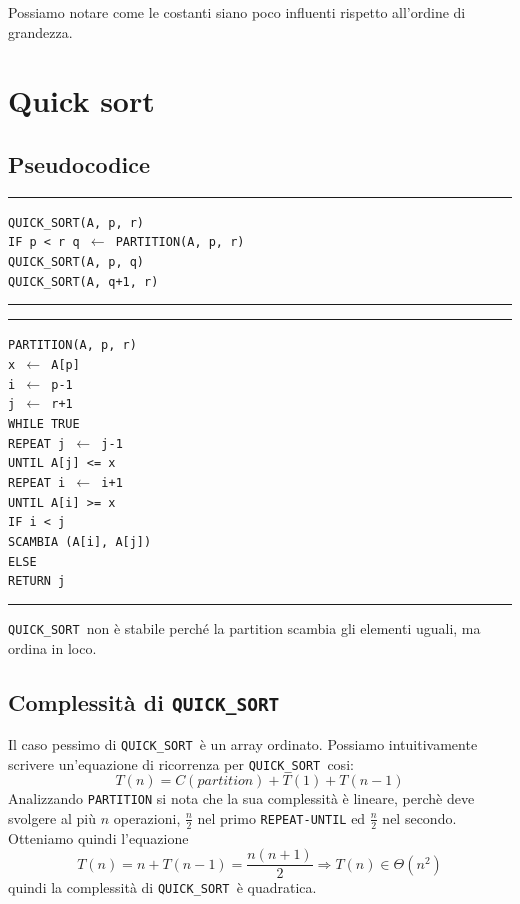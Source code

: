 \documentclass[a4paper,12pt,twoside]{report}
\newcommand\pseudo[1]{\setlength\parindent{0pt}\texttt{#1}\setlength\parindent{24pt} \\}
\newcommand\hlin{\noindent\rule[0.5ex]{\linewidth}{1pt}}
\newcommand\take[2]{#1 $\leftarrow$ #2}
\newcommand\quicksort{\texttt{QUICK\_SORT }}
\begin{document}
Possiamo notare come le costanti siano poco influenti rispetto all'ordine di grandezza.
\newpage
\section{Quick sort}
\subsection{Pseudocodice}
\hlin

\pseudo{QUICK\_SORT(A, p, r)} 
\texttt{\indent IF p < r 
\indent\indent \take{q}{PARTITION(A, p, r)} \\
\indent\indent QUICK\_SORT(A, p, q) \\
\indent\indent QUICK\_SORT(A, q+1, r) \\
}
\hlin

\hlin

\pseudo{PARTITION(A, p, r)}
\texttt{\indent \take{x}{A[p]} \\
\indent \take{i}{p-1} \\
\indent \take{j}{r+1} \\
\indent WHILE TRUE \\
\indent\indent REPEAT \take{j}{j-1} \\
\indent\indent UNTIL A[j] <= x \\
\indent\indent REPEAT \take{i}{i+1} \\
\indent\indent UNTIL A[i] >= x \\
\indent\indent IF i < j \\
\indent\indent\indent SCAMBIA (A[i], A[j]) \\
\indent\indent ELSE \\
\indent\indent\indent RETURN j
}

\hlin

\quicksort non \`{e} stabile perch\'{e} la partition scambia gli elementi uguali,  ma ordina in loco. 

\subsection{Complessit\`{a} di \quicksort}

Il caso pessimo di \quicksort \`{e} un array ordinato. Possiamo intuitivamente scrivere un'equazione di ricorrenza per \quicksort cosi:
\[ T(n) = C(partition) + T(1) + T(n-1) \]
Analizzando \texttt{PARTITION} si nota che la sua complessit\`{a} \`{e} lineare, perch\`{e} deve svolgere al pi\`{u} $n$ operazioni, $\frac{n}{2}$ nel primo \texttt{REPEAT-UNTIL} ed $\frac{n}{2}$ nel secondo. 
Otteniamo quindi l'equazione
\[ T(n) = n + T(n-1) = \frac{n(n+1)}{2} \Rightarrow T(n) \in \Theta(n^2) \]
quindi la complessit\`{a} di \quicksort \`{e} quadratica.
\end{document}
